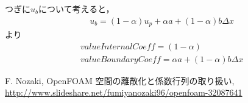 \documentclass[a4paper,fleqn]{jsarticle}
\begin{document}
つぎに$u_b$について考えると，
\begin{align}
& u_b=(1-\alpha)u_p+\alpha a +(1-\alpha)b\Delta x
\end{align}
より
\begin{align}
& valueInternalCoeff=(1-\alpha) \\
& valueBoundaryCoeff=\alpha a +(1-\alpha)b\Delta x
\end{align}



\begin{thebibliography}{99}
 F. Nozaki, OpenFOAM 空間の離散化と係数行列の取り扱い, \url{http://www.slideshare.net/fumiyanozaki96/openfoam-32087641}

\end{thebibliography}
\end{document}
